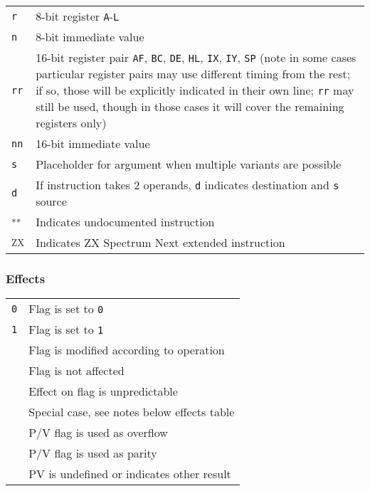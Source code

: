 \documentclass[12pt,twoside,openright,a4paper]{book}
\newcommand{\UNDOC}{\textnormal{\textsuperscript{**}}}
\newcommand{\ZXN}{\textnormal{\textsuperscript{ZX}}}
\begin{document}
\begin{tabularx}{\textwidth}{lX}
	{\tt r} & 
		8-bit register {\tt A}-{\tt L} \\
	{\tt n} &
		8-bit immediate value \\
	{\tt rr} & 
		16-bit register pair {\tt AF}, {\tt BC}, {\tt DE}, {\tt HL}, {\tt IX}, {\tt IY}, {\tt SP} (note in some cases particular register pairs may use different timing from the rest; if so, those will be explicitly indicated in their own line; {\tt rr} may still be used, though in those cases it will cover the remaining registers only) \\
	{\tt nn} & 
		16-bit immediate value \\
	{\tt s} &
		Placeholder for argument when multiple variants are possible \\
	{\tt d} &
		If instruction takes 2 operands, {\tt d} indicates destination and {\tt s} source \\
	\UNDOC & Indicates undocumented instruction \\
	\ZXN & Indicates ZX Spectrum Next extended instruction \\
		
	\end{tabularx}

\subsubsection{Effects}

\begin{tabular}{cl}
	{\tt 0} & Flag is set to {\tt 0} \\
	{\tt 1} & Flag is set to {\tt 1} \\
	{\tt \FS} & Flag is modified according to operation \\
	{\tt \FN} & Flag is not affected \\
	{\tt \FU} & Effect on flag is unpredictable \\
	{\tt \FX} & Special case, see notes below effects table \\
	\DetailParityOverflow{v} & P/V flag is used as overflow \\
	\DetailParityOverflow{p} & P/V flag is used as parity \\
	\DetailParityOverflow{} & PV is undefined or indicates other result \\
\end{tabular}
\end{document}
